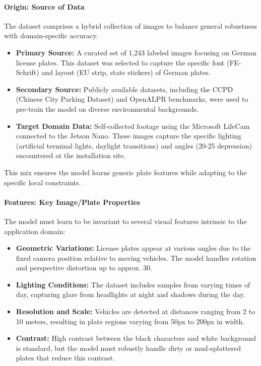 \paragraph{Origin: Source of Data}
The dataset comprises a hybrid collection of images to balance general robustness with domain-specific accuracy.
\begin{itemize}
	\item \textbf{Primary Source:} A curated set of 1,243 labeled images focusing on German license plates. This dataset was selected to capture the specific font (FE-Schrift) and layout (EU strip, state stickers) of German plates.
	\item \textbf{Secondary Source:} Publicly available datasets, including the CCPD (Chinese City Parking Dataset) and OpenALPR benchmarks, were used to pre-train the model on diverse environmental backgrounds.
	\item \textbf{Target Domain Data:} Self-collected footage using the Microsoft LifeCam connected to the Jetson Nano. These images capture the specific lighting (artificial terminal lights, daylight transitions) and angles (20-25\textdegree{} depression) encountered at the installation site.
\end{itemize}
This mix ensures the model learns generic plate features while adapting to the specific local constraints.

\paragraph{Features: Key Image/Plate Properties}
The model must learn to be invariant to several visual features intrinsic to the application domain:
\begin{itemize}
	\item \textbf{Geometric Variations:} License plates appear at various angles due to the fixed camera position relative to moving vehicles. The model handles rotation and perspective distortion up to approx. 30\textdegree.
	\item \textbf{Lighting Conditions:} The dataset includes samples from varying times of day, capturing glare from headlights at night and shadows during the day.
	\item \textbf{Resolution and Scale:} Vehicles are detected at distances ranging from 2 to 10 meters, resulting in plate regions varying from 50px to 200px in width.
	\item \textbf{Contrast:} High contrast between the black characters and white background is standard, but the model must robustly handle dirty or mud-splattered plates that reduce this contrast.
\end{itemize}

